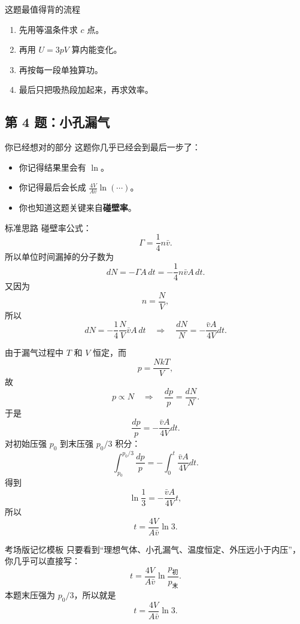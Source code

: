\documentclass[11pt,a4paper]{ctexart}
\newcommand{\key}[1]{\textcolor{theme}{\textbf{#1}}}
\begin{document}
\begin{summarybox}{这题最值得背的流程}
\begin{enumerate}
  \item 先用等温条件求 \(c\) 点。
  \item 再用 \(U=3pV\) 算内能变化。
  \item 再按每一段单独算功。
  \item 最后只把吸热段加起来，再求效率。
\end{enumerate}
\end{summarybox}

\subsection*{第 4 题：小孔漏气}

\begin{goodbox}{你已经想对的部分}
这题你几乎已经会到最后一步了：
\begin{itemize}
  \item 你记得结果里会有 \(\ln\)。
  \item 你记得最后会长成 \(\frac{4V}{A\bar v}\ln(\cdots)\)。
  \item 你也知道这题关键来自\key{碰壁率}。
\end{itemize}
\end{goodbox}

\begin{stepbox}{标准思路}
碰壁率公式：
\[
\Gamma=\frac14 n\bar v.
\]
所以单位时间漏掉的分子数为
\[
dN=-\Gamma A\,dt
  =-\frac14 n\bar v A\,dt.
\]
又因为
\[
n=\frac{N}{V},
\]
所以
\[
dN=-\frac14\frac{N}{V}\bar v A\,dt
\quad\Rightarrow\quad
\frac{dN}{N}=-\frac{\bar v A}{4V}dt.
\]

由于漏气过程中 \(T\) 和 \(V\) 恒定，而
\[
p=\frac{NkT}{V},
\]
故
\[
p\propto N
\quad\Rightarrow\quad
\frac{dp}{p}=\frac{dN}{N}.
\]
于是
\[
\frac{dp}{p}=-\frac{\bar v A}{4V}dt.
\]
对初始压强 \(p_0\) 到末压强 \(p_0/3\) 积分：
\[
\int_{p_0}^{p_0/3}\frac{dp}{p}
=
-\int_0^t \frac{\bar v A}{4V}dt.
\]
得到
\[
\ln\frac{1}{3}=-\frac{\bar v A}{4V}t,
\]
所以
\[
t=\frac{4V}{A\bar v}\ln 3.
\]
\end{stepbox}

\begin{summarybox}{考场版记忆模板}
只要看到“理想气体、小孔漏气、温度恒定、外压远小于内压”，你几乎可以直接写：
\[
t=\frac{4V}{A\bar v}\ln\frac{p_{\text{初}}}{p_{\text{末}}}.
\]
本题末压强为 \(p_0/3\)，所以就是
\[
t=\frac{4V}{A\bar v}\ln 3.
\]
\end{summarybox}
\end{document}
